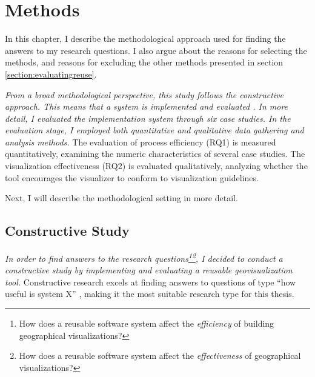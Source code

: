 
\chapter{Methods}
\label{chapter:methods}

In this chapter, I describe the methodological approach used for finding the answers to my research questions. I also argue about the reasons for selecting the methods, and reasons for excluding the other methods presented in section \ref{section:evaluatingreuse}. 

\emph{From a broad methodological perspective, this study follows the constructive approach. This means that a system is implemented and evaluated \citep{jarvinen_tutkimustyon_2012}. In more detail, I evaluated the implementation system through six case studies. In the evaluation stage, I employed both quantitative and qualitative data gathering and analysis methods.} The evaluation of process efficiency (RQ1) is measured quantitatively, examining the numeric characteristics of several case studies. The visualization effectiveness (RQ2) is evaluated qualitatively, analyzing whether the tool encourages the visualizer to conform to visualization guidelines.

Next, I will describe the methodological setting in more detail.

\section{Constructive Study}

\emph{In order to find answers to the research questions\footnote{How does a reusable software system affect the \emph{efficiency} of building geographical visualizations?}\footnote{How does a reusable software system affect the \emph{effectiveness} of geographical visualizations?}, I decided to conduct a constructive study by implementing and evaluating a reusable geovisualization tool.} Constructive research excels at finding answers to questions of type ``how useful is system X'' \citep{jarvinen_tutkimustyon_2012}, making it the most suitable research type for this thesis.

